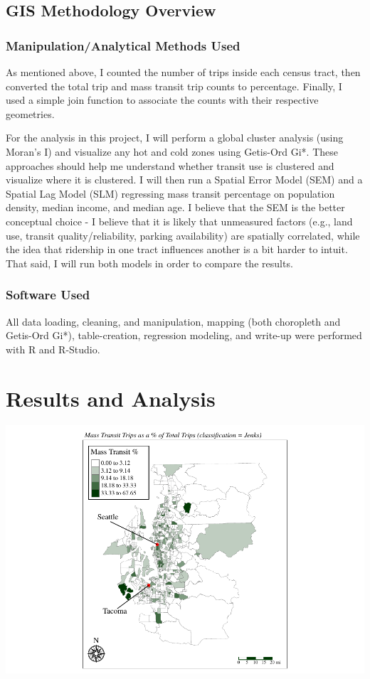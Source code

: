 \documentclass[
]{article}
\begin{document}
\subsection{GIS Methodology Overview}\label{gis-methodology-overview}

\subsubsection{Manipulation/Analytical Methods
Used}\label{manipulationanalytical-methods-used}

As mentioned above, I counted the number of trips inside each census
tract, then converted the total trip and mass transit trip counts to
percentage. Finally, I used a simple join function to associate the
counts with their respective geometries.

For the analysis in this project, I will perform a global cluster
analysis (using Moran's I) and visualize any hot and cold zones using
Getis-Ord Gi*. These approaches should help me understand whether
transit use is clustered and visualize where it is clustered. I will
then run a Spatial Error Model (SEM) and a Spatial Lag Model (SLM)
regressing mass transit percentage on population density, median income,
and median age. I believe that the SEM is the better conceptual choice -
I believe that it is likely that unmeasured factors (e.g., land use,
transit quality/reliability, parking availability) are spatially
correlated, while the idea that ridership in one tract influences
another is a bit harder to intuit. That said, I will run both models in
order to compare the results.

\subsubsection{Software Used}\label{software-used}

All data loading, cleaning, and manipulation, mapping (both choropleth
and Getis-Ord Gi*), table-creation, regression modeling, and write-up
were performed with R and R-Studio.

\section{Results and Analysis}\label{results-and-analysis}

\includegraphics{transit-hotspots-PSRC_files/figure-latex/unnamed-chunk-3-1.pdf}
\end{document}
